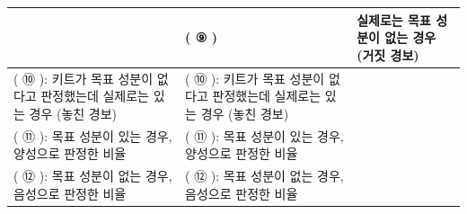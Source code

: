 \documentclass[fs9,seriesRus]{korfarm-base}
\begin{document}
\begin{tcolorbox}
\begin{tabularx}{\linewidth}{|>{\centering\arraybackslash}p{1.6cm}|>{\raggedright\arraybackslash}p{3.4cm}|>{\raggedright\arraybackslash}X|}
 & ( ⑨ ) & 실제로는 목표 성분이 없는 경우 (거짓 경보) \\\cline{2-3}
\hline
( ⑩ ): 키트가 목표 성분이 없다고 판정했는데 실제로는 있는 경우 (놓친 경보) & ( ⑩ ): 키트가 목표 성분이 없다고 판정했는데 실제로는 있는 경우 (놓친 경보) &  \\\hline
( ⑪ ): 목표 성분이 있는 경우, 양성으로 판정한 비율 & ( ⑪ ): 목표 성분이 있는 경우, 양성으로 판정한 비율 &  \\\hline
( ⑫ ): 목표 성분이 없는 경우, 음성으로 판정한 비율 & ( ⑫ ): 목표 성분이 없는 경우, 음성으로 판정한 비율 &  \\\hline
\end{tabularx}
\end{tcolorbox}\par\medskip
{}
\end{document}
